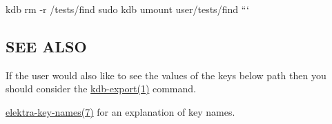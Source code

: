 kdb rm -\/r /tests/find sudo kdb umount user/tests/find ```\hypertarget{doc_help_kdb-find_md_autotoc_md1831}{}\subsection{S\+E\+E A\+L\+SO}\label{doc_help_kdb-find_md_autotoc_md1831}

\begin{DoxyItemize}
\item If the user would also like to see the values of the keys below {\ttfamily path} then you should consider the \hyperlink{doc_help_kdb-export_md}{kdb-\/export(1)} command.
\item \hyperlink{doc_help_elektra-key-names_md}{elektra-\/key-\/names(7)} for an explanation of key names. 
\end{DoxyItemize}